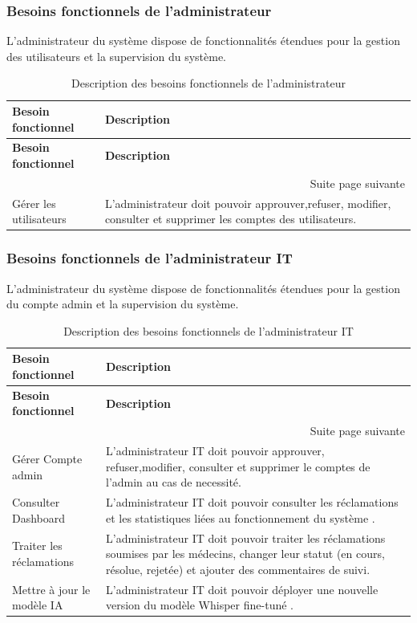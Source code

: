 \documentclass[12pt,a4paper]{report}
\begin{document}
\subsubsection{Besoins fonctionnels de l'administrateur}
L'administrateur du système dispose de fonctionnalités étendues pour la gestion des utilisateurs et la supervision du système.

\begin{longtable}{|p{5cm}|p{10cm}|}
\caption{Description des besoins fonctionnels de l'administrateur} \\
\hline
\textbf{Besoin fonctionnel} & \textbf{Description} \\
\hline
\endfirsthead
\hline
\textbf{Besoin fonctionnel} & \textbf{Description} \\
\hline
\endhead
\hline
\multicolumn{2}{|r|}{{Suite page suivante}} \\
\hline
\endfoot
\hline
\endlastfoot
Gérer les utilisateurs & L'administrateur doit pouvoir approuver,refuser, modifier, consulter et supprimer les comptes des utilisateurs. \\
\end{longtable}
\vspace{0.5cm}

\subsubsection{Besoins fonctionnels de l'administrateur IT}
L'administrateur du système dispose de fonctionnalités étendues pour la gestion du compte admin et la supervision du système.

\begin{longtable}{|p{5cm}|p{10cm}|}
\caption{Description des besoins fonctionnels de l'administrateur IT} \\
\hline
\textbf{Besoin fonctionnel} & \textbf{Description} \\
\hline
\endfirsthead
\hline
\textbf{Besoin fonctionnel} & \textbf{Description} \\
\hline
\endhead
\hline
\multicolumn{2}{|r|}{{Suite page suivante}} \\
\hline
\endfoot
\hline
\endlastfoot

Gérer Compte admin & L'administrateur IT doit pouvoir approuver, refuser,modifier, consulter et supprimer le comptes de l'admin au cas de necessité. \\
\hline Consulter Dashboard & L'administrateur IT doit pouvoir consulter les réclamations et les statistiques liées au fonctionnement du système .  \\
\hline
Traiter les réclamations &
L'administrateur IT doit pouvoir traiter les réclamations soumises par les médecins, changer leur statut (en cours, résolue, rejetée) et ajouter des commentaires de suivi. \\
\hline
Mettre à jour le modèle IA &
L'administrateur IT doit pouvoir déployer une nouvelle version du modèle Whisper fine-tuné . \\
\hline
\end{longtable}
\end{document}
